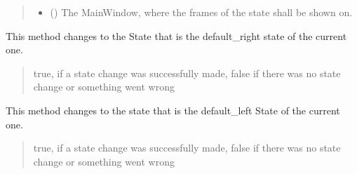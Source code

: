 \documentclass[letterpaper,10pt,english]{sphinxmanual}
\begin{document}
\begin{fulllineitems}
\begin{fulllineitems}
\begin{quote}
\begin{description}
\begin{itemize}
\item {} 
\sphinxAtStartPar
{} ({\hyperref[\detokenize{apidoc/src.osm_configurator.view.states:src.osm_configurator.view.states.main_window.MainWindow}]{}}) \textendash{} The MainWindow, where the frames of the state shall be shown on.

\end{itemize}

\end{description}\end{quote}

\end{fulllineitems}


\begin{fulllineitems}
\label{\detokenize{apidoc/src.osm_configurator.view.states:src.osm_configurator.view.states.state_manager.StateManager.default_go_right}}
\pysigstartsignatures
{}
\pysigstopsignatures
\sphinxAtStartPar
This method changes to the State that is the default\_right state of the current one.
\begin{quote}\begin{description}
\sphinxAtStartPar
true, if a state change was successfully made, false if there was no state change or something
went wrong

\sphinxAtStartPar
{}

\end{description}\end{quote}

\end{fulllineitems}


\begin{fulllineitems}
\label{\detokenize{apidoc/src.osm_configurator.view.states:src.osm_configurator.view.states.state_manager.StateManager.default_go_left}}
\pysigstartsignatures
{}
\pysigstopsignatures
\sphinxAtStartPar
This method changes to the state that is the default\_left State of the current one.
\begin{quote}\begin{description}
\sphinxAtStartPar
true, if a state change was successfully made, false if there was no state change or something
went wrong


\end{description}
\end{quote}
\end{fulllineitems}
\end{fulllineitems}
\end{document}
